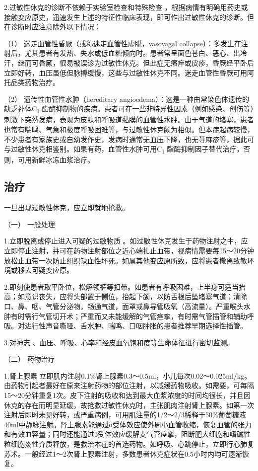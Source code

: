 2.过敏性休克的诊断不依赖于实验室检查和特殊检查
，根据病情有明确用药史或接触变应原史，迅速发生上述的特征性临床表现，即可作出过敏性休克的诊断。但在诊断时应注意除外以下情况：

（1） 迷走血管性昏厥（或称迷走血管性虚脱，vasovagal
collapse）：多发生在注射后，尤其患者有发热、失水或低血糖倾向时。患者常呈面色苍白、恶心、出冷汗，继而可昏厥，很易被误诊为过敏性休克。但此症无瘙痒或皮疹，昏厥经平卧后立即好转，血压虽低但脉搏缓慢，这些与过敏性休克不同。迷走血管性昏厥可用阿托品类药物治疗。

（2） 遗传性血管性水肿（hereditary
angioedema）：这是一种由常染色体遗传的缺乏补体C\textsubscript{1}
酯酶抑制物的疾病。患者可在一些非特异性因素（例如感染、创伤等）刺激下突然发病，表现为皮肤和呼吸道黏膜的血管性水肿。由于气道的堵塞，患者也常有喘鸣、气急和极度呼吸困难等，与过敏性休克颇为相似。但本症起病较慢，不少患者有家族史或自幼发作史，发病时通常无血压下降，也无荨麻疹等，据此可与过敏性休克相鉴别。如果有药，血管性水肿可用C\textsubscript{1}
酯酶抑制因子替代治疗，否则，可用新鲜冰冻血浆治疗。

\subsection{治疗}

一旦出现过敏性休克，应立即就地抢救。

\hypertarget{text00063.htmlux5cux23CHP2-5-3-1}{}
（一） 一般处理

1.立即脱离或停止进入可疑的过敏物质
。如过敏性休克发生于药物注射之中，应立即停止注射，并可在药物注射部位之近心端扎止血带，视病情需要每15～20分钟放松止血带一次防止组织缺血性坏死。如属其他变应原所致，应将患者撤离致敏环境或移去可疑变应原。

2.即刻使患者取平卧位，松解领裤等扣带。如患者有呼吸困难，上半身可适当抬高；如意识丧失，应将头部置于侧位，抬起下颌，以防舌根后坠堵塞气道；清除口、鼻、咽、气管分泌物，畅通气道，面罩或鼻导管吸氧（高流量）。严重喉头水肿有时需行气管切开术；严重而又未能缓解的气管痉挛，有时需气管插管和辅助呼吸。对进行性声音嘶哑、舌水肿、喘鸣、口咽肿胀的患者推荐早期选择性插管。

3.对神志 、血压、呼吸、心率和经皮血氧饱和度等生命体征进行密切监测。

\hypertarget{text00063.htmlux5cux23CHP2-5-3-2}{}
（二） 药物治疗

1.肾上腺素
立即肌内注射0.1\%肾上腺素0.3～0.5ml，小儿每次0.02～0.025ml/kg。由药物引起者最好在原来注射药物的部位注射，以减缓药物吸收。如需要，可每隔15～20分钟重复1次。皮下注射的吸收和达到最大血浆浓度的时间均很长，并且因休克的存在而明显延缓，故抢救过敏性休克时，主张肌肉注射肾上腺素。如第一次注射后即时未见好转，或严重病例，可用肌注量的1/2～2/3稀释于50\%葡萄糖液40ml中静脉注射。肾上腺素能通过α受体效应使外周小血管收缩，恢复血管的张力和有效血容量；同时还能通过β受体效应缓解支气管痉挛，阻断肥大细胞和嗜碱性粒细胞炎性介质释放，是救治本症的首选药物。如呼吸、心跳停止，立即行心肺复苏术。一般经过1～2次肾上腺素注射，多数患者休克症状在0.5小时内均可逐渐恢复。

